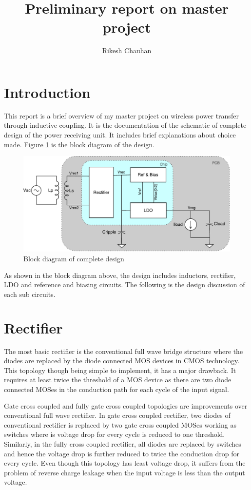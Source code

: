 \documentclass[12pt,a4paper,UKenglish]{article}
\title{Preliminary report on master project}
\author{Rikesh Chauhan}
\date{}
\begin{document}
\maketitle

\section{Introduction}
This report is a brief overview of my master project on wireless power transfer through inductive coupling. It is the documentation of the schematic of complete design of the power receiving unit. It includes brief explanations about choice made. Figure \ref{fig:blockd} is the block diagram of the design.

\begin{figure}[htbp] %
   \centering
   \includegraphics[width=\textwidth]{img/block_diagram.pdf} 
   \caption{Block diagram of complete design}
   \label{fig:blockd}
\end{figure}

As shown in the block diagram above, the design includes inductors, rectifier, LDO and reference and biasing circuits. The following is the design discussion of each sub circuits.

\section{Rectifier}

The most basic rectifier is  the conventional full wave bridge structure where the diodes are replaced by the diode connected MOS devices in CMOS technology. This topology though being simple to implement, it has a major drawback. It requires at least twice the threshold of a MOS device as there are two diode connected MOSes in the conduction path for each cycle of the input signal.  

Gate cross coupled and fully gate cross coupled topologies are improvements over conventional full wave rectifier. In gate cross coupled rectifier, two diodes of conventional rectifier is replaced by two gate cross coupled MOSes working as switches where is voltage drop for every cycle is reduced to one threshold. Similarly, in the fully cross coupled rectifier, all diodes are replaced by switches and hence the voltage drop is further reduced to twice the conduction drop for every cycle. Even though this topology has least voltage drop, it suffers from the problem of reverse charge leakage when the input voltage is less than the output voltage.
\end{document}
